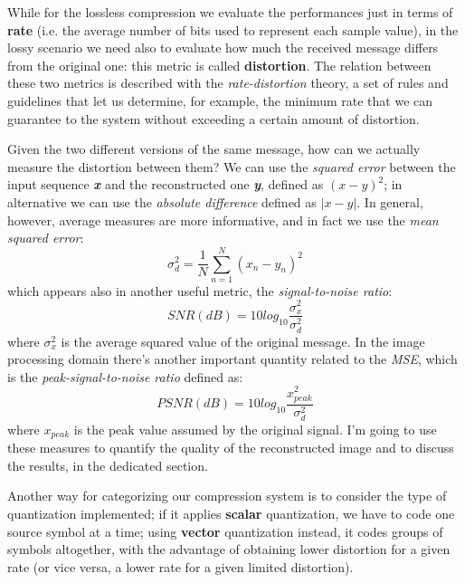 \documentclass{report}
\begin{document}
While for the lossless compression we evaluate the performances just in terms of \textbf{rate} (i.e. the average number of bits used to represent each sample value), in the lossy scenario we need also to evaluate how much the received message differs from the original one: this metric is called \textbf{distortion}. The relation between these two metrics is described with the \textit{rate-distortion} \cite{rate_dist} theory, a set of rules and guidelines that let us determine, for example, the minimum rate that we can guarantee to the system without exceeding a certain amount of distortion.

Given the two different versions of the same message, how can we actually measure the distortion between them? We can use the \textit{squared error} between the input sequence \textbf{\textit{x}} and the reconstructed one \textbf{\textit{y}}, defined as $(x-y)^2$; in alternative we can use the \textit{absolute difference} defined as $|x-y|$. In general, however, average measures are more informative, and in fact we use the \textit{mean squared error}:
\begin{equation}
\sigma^2_d = \frac{1}{N} \sum_{n = 1}^{N} (x_n - y_n)^2
\end{equation}
which appears also in another useful metric, the \textit{signal-to-noise ratio}:
\begin{equation}
SNR(dB) = 10log_{10}\frac{\sigma^2_x}{\sigma^2_d}
\end{equation}
where $\sigma^2_x$ is the average squared value of the original message. In the image processing domain there's another important quantity related to the \textit{MSE}, which is the \textit{peak-signal-to-noise ratio} defined as: 
\begin{equation}
PSNR(dB) = 10log_{10}\frac{x^2_{peak}}{\sigma^2_d} 
\end{equation}
where $x_{peak}$ is the peak value assumed by the original signal. I'm going to use these measures to quantify the quality of the reconstructed image and to discuss the results, in the dedicated section.

Another way for categorizing our compression system is to consider the type of quantization implemented; if it applies \textbf{scalar} quantization, we have to code one source symbol at a time; using \textbf{vector} quantization instead, it codes groups of symbols altogether, with the advantage of obtaining lower distortion for a given rate (or vice versa, a lower rate for a given limited distortion). %
\end{document}
